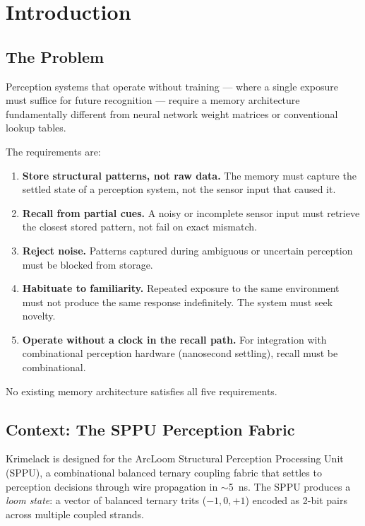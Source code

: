 \documentclass[11pt, a4paper]{article}
\begin{document}
\section{Introduction}

\subsection{The Problem}

Perception systems that operate without training --- where a
single exposure must suffice for future recognition --- require
a memory architecture fundamentally different from neural network
weight matrices or conventional lookup tables.

The requirements are:
\begin{enumerate}[nosep]
  \item \textbf{Store structural patterns, not raw data.}
        The memory must capture the settled state of a
        perception system, not the sensor input that caused it.
  \item \textbf{Recall from partial cues.}
        A noisy or incomplete sensor input must retrieve the
        closest stored pattern, not fail on exact mismatch.
  \item \textbf{Reject noise.}
        Patterns captured during ambiguous or uncertain
        perception must be blocked from storage.
  \item \textbf{Habituate to familiarity.}
        Repeated exposure to the same environment must not
        produce the same response indefinitely. The system
        must seek novelty.
  \item \textbf{Operate without a clock in the recall path.}
        For integration with combinational perception
        hardware (nanosecond settling), recall must be
        combinational.
\end{enumerate}

No existing memory architecture satisfies all five requirements.

\subsection{Context: The SPPU Perception Fabric}

Krimelack is designed for the ArcLoom Structural Perception
Processing Unit (SPPU), a combinational balanced ternary
coupling fabric that settles to perception decisions through
wire propagation in $\sim$5~ns. The SPPU produces a
\textit{loom state}: a vector of balanced ternary trits
($-1, 0, +1$) encoded as 2-bit pairs across multiple
coupled strands.
\end{document}
